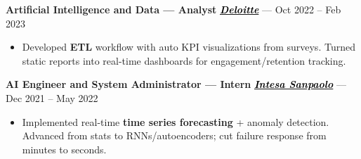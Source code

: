 \documentclass[11pt,a4paper]{article}
\let\OldHref\href
\renewcommand{\href}[2]{\OldHref{#1}{\textit{#2}}}
\begin{document}
{        \textbf{Artificial Intelligence and Data — Analyst} \hfill \href{https://www2.deloitte.com/}{\textbf{\textcolor{black}{Deloitte}}} — Oct 2022 -- Feb 2023
        \begin{itemize}
            \item Developed \textbf{ETL} workflow with auto KPI visualizations from surveys. Turned static reports into real-time dashboards for engagement/retention tracking.
		\end{itemize}
        
        \textbf{AI Engineer and System Administrator — Intern} \hfill \href{https://www.intesasanpaolo.com/}{\textbf{\textcolor{black}{Intesa Sanpaolo}}} — Dec 2021 -- May 2022
        \begin{itemize}
            \item Implemented real-time \textbf{time series forecasting} + anomaly detection. Advanced from stats to RNNs/autoencoders; cut failure response from minutes to seconds.
		\end{itemize}
    }
    
\end{document}
